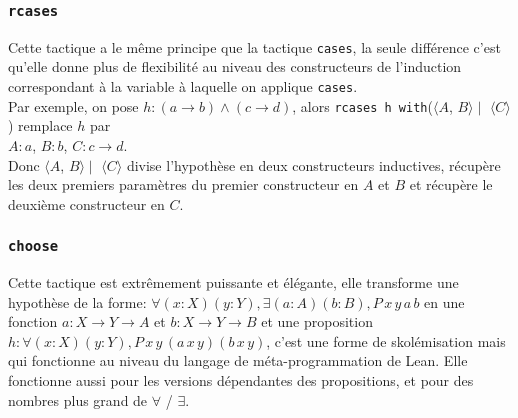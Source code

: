     \subsubsection{\texttt{rcases}}
     Cette tactique a le même principe que la tactique \texttt{cases}, la seule différence c'est qu'elle donne plus de flexibilité au niveau des constructeurs de l'induction correspondant à la variable à laquelle on applique \texttt{cases}. \\ Par exemple, on pose $h:(a\rightarrow b)\wedge(c\rightarrow d)$, alors \texttt{rcases h with}($\langle A$, $B \rangle \mid $ $\langle C \rangle$) remplace $h$ par \\ $A:a$, $B:b$, $C:c\rightarrow d$.\\ Donc $\langle A$, $B \rangle \mid$ $\langle C\rangle$ divise l'hypothèse en deux constructeurs inductives, récupère les deux premiers paramètres du premier constructeur en $A$ et $B$ et récupère le deuxième constructeur en $C$. 
     \subsubsection{\texttt{choose}}
     Cette tactique est extrêmement puissante et élégante, elle transforme une hypothèse de la forme: $\forall (x\colon X) (y\colon Y), \exists (a \colon A) (b\colon B), P \, x \, y \, a\, b$ en une fonction $a : X \to Y \to A$ et $b : X \to Y \to B$ et une proposition $h\colon \forall (x\colon X) (y\colon Y), P \,x \,y \,(a\, x\, y) (b\, x \,y)$, c'est une forme de skolémisation mais qui fonctionne au niveau du langage de méta-programmation de Lean.
     Elle fonctionne aussi pour les versions dépendantes des propositions, et pour des nombres plus grand de $\forall$ / $\exists$.
